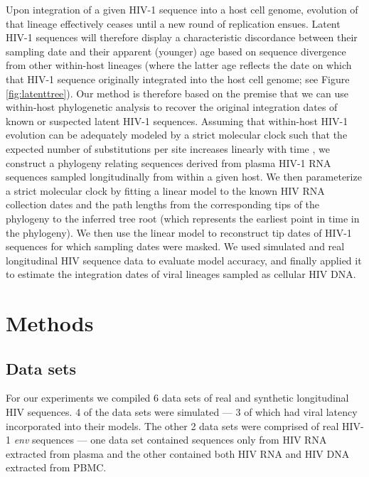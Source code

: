 \documentclass[12pt]{article}
\begin{document}
Upon integration of a given HIV-1 sequence into a host cell genome, evolution of that lineage effectively ceases until a new round of replication ensues.
Latent HIV-1 sequences will therefore display a characteristic discordance between their sampling date and their apparent (younger) age based on sequence divergence from other within-host lineages (where the latter age reflects the date on which that HIV-1 sequence originally integrated into the host cell genome; see Figure \ref{fig:latenttree}).
Our method is therefore based on the premise that we can use within-host phylogenetic analysis to recover the original integration dates of known or suspected latent HIV-1 sequences.
Assuming that within-host HIV-1 evolution can be adequately modeled by a strict molecular clock such that the expected number of substitutions per site increases linearly with time \citep{Ho14}, we construct a phylogeny relating sequences derived from plasma HIV-1 RNA sequences sampled longitudinally from within a given host. We then parameterize a strict molecular clock by fitting a linear model to the known HIV RNA collection dates and the path lengths from the corresponding tips of the phylogeny to the inferred tree root (which represents the earliest point in time in the phylogeny).
We then use the linear model to reconstruct tip dates of HIV-1 sequences for which sampling dates were masked. We used simulated and real longitudinal HIV sequence data to evaluate model accuracy, and finally applied it to estimate the integration dates of viral lineages sampled as cellular HIV DNA.


\section * {Methods} \label{sec:methods}

\subsection * {Data sets}
For our experiments we compiled 6 data sets of real and synthetic longitudinal HIV sequences.
4 of the data sets were simulated --- 3 of which had viral latency incorporated into their models.
The other 2 data sets were comprised of real HIV-1 \emph{env} sequences --- one data set contained sequences only from HIV RNA extracted from plasma and the other contained both HIV RNA and HIV DNA extracted from PBMC.
\end{document}
